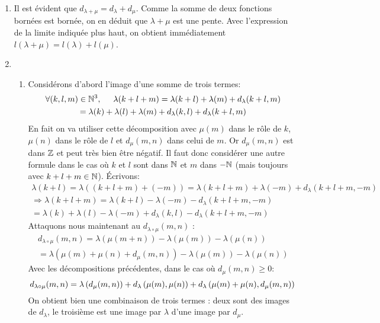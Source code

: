 \begin{enumerate}
 \item Il est évident que $d_{\lambda + \mu}=d_\lambda + d_\mu$. Comme la somme de deux fonctions bornées est bornée, on en déduit que $\lambda + \mu$ est une pente. Avec l'expression de la limite indiquée plus haut, on obtient immédiatement $l(\lambda + \mu)=l(\lambda)+l(\mu)$.
 \item
\begin{enumerate}
 \item Considérons d'abord l'image d'une somme de trois termes:
\begin{multline*}
\forall (k,l,m)\in \mathbb{N}^3,\hspace{0.5cm} \lambda(k+l+m)=\lambda(k+l)+\lambda(m)+d_\lambda(k+l,m)\\
=\lambda(k) + \lambda(l) + \lambda(m) + d_\lambda(k,l) + d_\lambda(k+l,m)
\end{multline*}
En fait on va utiliser cette décomposition avec $\mu(m)$ dans le rôle de $k$, $\mu(n)$ dans le rôle de $l$ et $d_\mu(m,n)$ dans celui de $m$. Or $d_\mu(m,n)$ est dans $\mathbb{Z}$ et peut très bien être négatif. Il faut donc considérer une autre formule dans le cas où $k$ et $l$ sont dans $\mathbb{N}$ et $m$ dans $-\mathbb{N}$ (mais toujours avec $k+l+m \in \mathbb{N}$). \'Ecrivons:
\begin{multline*}
 \lambda(k+l)= \lambda((k+l+m)+(-m))=\lambda(k+l+m) + \lambda(-m) + d_\lambda(k+l+m,-m)\\
 \Rightarrow
 \lambda(k+l+m) = \lambda(k+l) - \lambda(-m) - d_\lambda(k+l+m,-m)\\
 = \lambda(k) + \lambda(l) - \lambda(-m) + d_\lambda(k,l) - d_\lambda(k+l+m,-m)
\end{multline*}
Attaquons nous maintenant au $d_{\lambda\circ \mu}(m,n)$ :
\begin{multline*}
d_{\lambda\circ \mu}(m,n)
= \lambda(\mu(m+n))-\lambda(\mu(m))-\lambda(\mu(n))\\
= \lambda(\mu(m)+\mu(n)+d_\mu(m,n))-\lambda(\mu(m))-\lambda(\mu(n))
\end{multline*}
Avec les décompositions précédentes, dans le cas où $d_\mu(m,n)\geq 0$:
\begin{displaymath}
d_{\lambda\circ \mu}(m,n)  
= \lambda\left( d_\mu(m,n)\right)  + d_\lambda\left( \mu(m),\mu(n)\right)  + d_\lambda\left( \mu(m)+\mu(n),d_\mu(m,n)\right) \\
\end{displaymath}
On obtient bien une combinaison de trois termes : deux sont des images de $d_\lambda$, le troisième est une image par $\lambda$ d'une image par $d_\mu$.\newline

\end{enumerate}
\end{enumerate}
